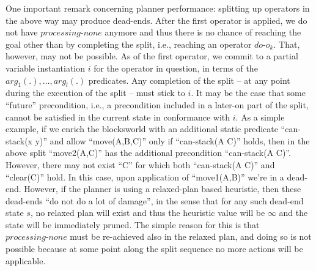 One important remark concerning planner performance: splitting up
operators in the above way may produce dead-ends. After the first
operator is applied, we do not have $processing\mbox{-}none$ anymore
and thus there is no chance of reaching the goal other than by
completing the split, i.e., reaching an operator
$do\mbox{-}o_k$. That, however, may not be possible. As of the first
operator, we commit to a partial variable instantiation $i$ for the
operator in question, in terms of the $arg_1(.), \dots, arg_l(.)$
predicates. Any completion of the split -- at any point during the
execution of the split -- must stick to $i$. It may be the case that
some ``future'' precondition, i.e., a precondition included in a
later-on part of the split, cannot be satisfied in the current state
in conformance with $i$. As a simple example, if we enrich the
blocksworld with an additional static predicate ``can-stack(x y)'' and
allow ``move(A,B,C)'' only if ``can-stack(A C)'' holds, then in the
above split ``move2(A,C)'' has the additional precondition
``can-stack(A C)''. However, there may not exist ``C'' for which both
``can-stack(A C)'' and ``clear(C)'' hold. In this case, upon
application of ``move1(A,B)'' we're in a dead-end. However, if the
planner is using a relaxed-plan based heuristic, then these dead-ends
``do not do a lot of damage'', in the sense that for any such dead-end
state $s$, no relaxed plan will exist and thus the heuristic value
will be $\infty$ and the state will be immediately pruned. The simple
reason for this is that $processing\mbox{-}none$ must be re-achieved
also in the relaxed plan, and doing so is not possible because at some
point along the split sequence no more actions will be applicable.























